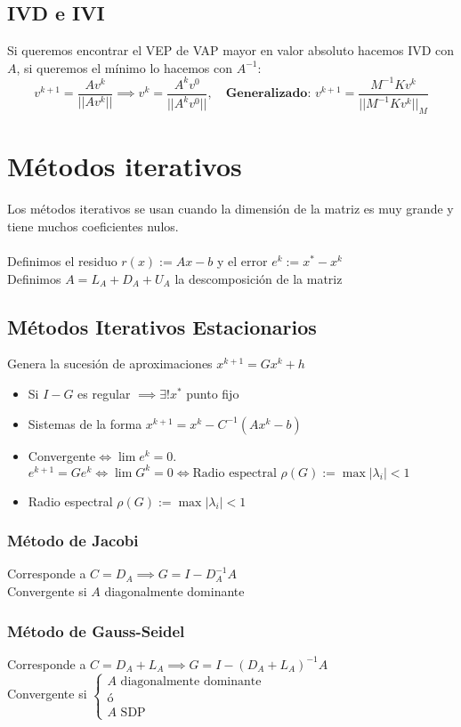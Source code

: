 \documentclass[leqno]{article}
\newcommand{\norm}[1]{\lvert \lvert #1 \rvert \rvert }
\newcommand{\h}{\hspace{1em}}
\begin{document}
\subsection{IVD e IVI}
Si queremos encontrar el VEP de VAP mayor en valor absoluto hacemos IVD con $A$, si queremos el mínimo lo hacemos con $A^{-1}$:
$$
v^{k+1} = \dfrac{Av^k}{\norm{Av^k}} \implies v^k = \dfrac{A^kv^0}{\norm{A^kv^0}}, \h \textbf{Generalizado: } v^{k+1} = \dfrac{M^{-1}Kv^k}{\norm{M^{-1}Kv^k}_{M}}
$$

\section{Métodos iterativos}
Los métodos iterativos se usan cuando la dimensión de la matriz es muy grande y tiene muchos coeficientes nulos. \\
\\
Definimos el residuo $r(x):=Ax-b$ y el error $e^k:=x^* -x^k$ \\
Definimos $A = L_A + D_A + U_A$ la descomposición de la matriz
\subsection{Métodos Iterativos Estacionarios}
Genera la sucesión de aproximaciones $x^{k+1}=Gx^k + h$\\
\begin{itemize}
    \item Si $I-G$ es regular $\implies \exists! x^*$ punto fijo  
    \item Sistemas de la forma $x^{k+1}=x^k - C^{-1}(Ax^k -b)$
    \item Convergente$\iff \lim e^k = 0$. $e^{k+1}=Ge^k \iff \lim G^k = 0 \iff \text{Radio espectral } \rho(G):=\max |\lambda_i|<1$
    \item Radio espectral $\rho(G):=\max |\lambda_i|<1$
\end{itemize}
\subsubsection{Método de Jacobi}
Corresponde a $C = D_A \implies G = I-D_A^{-1}A$ \\
Convergente si $A$ diagonalmente dominante
\subsubsection{Método de Gauss-Seidel}
Corresponde a $C = D_A + L_A \implies G = I-(D_A+L_A)^{-1}A$ \\
Convergente si $\begin{cases}
    A \text{ diagonalmente dominante} \\
    \text{ó} \\
    A \text{ SDP}
\end{cases}$
\end{document}
